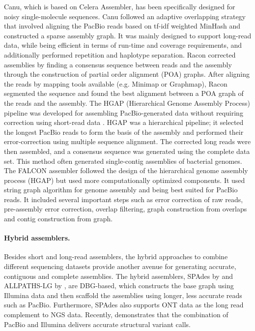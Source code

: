 Canu, which is based on Celera Assembler, has been specifically designed for noisy single-molecule sequences.
Canu followed an adaptive overlapping strategy that involved aligning the PacBio reads based on tf-idf weighted MinHash \citep{berlin2015assembling} and constructed a sparse assembly graph.
It was mainly designed to support long-read data, while being efficient in terms of run-time and coverage requirements, and additionally performed repetition and haplotype separation.
Racon corrected assemblies by finding a consensus sequence between reads and the assembly through the construction of partial order alignment (POA) graphs.
After aligning the reads by mapping tools available (e.g. Minimap or Graphmap),
Racon segmented the sequence and found the best alignment between a POA graph of the reads and the assembly.
The HGAP (Hierarchical Genome Assembly Process) pipeline
was developed for assembling PacBio-generated data without requiring correction using short-read
data \citep{chin2013nonhybrid}. HGAP was a hierarchical pipeline; it selected the longest PacBio reads to form the basis
of the assembly and performed their error-correction using multiple sequence alignment. The corrected
long reads were then assembled, and a consensus sequence was generated using the complete data
set. This method often generated single-contig assemblies of bacterial genomes.
The FALCON assembler followed the design of the hierarchical genome assembly process (HGAP) but used more computationally optimized components. 
It used string graph algorithm for genome assembly and being best suited for PacBio reads.
It included several important steps such as error correction of raw reads, pre-assembly error correction, overlap filtering, graph construction from overlaps and contig construction from graph.

\paragraph{Hybrid assemblers.}
Besides short and long-read assemblers, the hybrid approaches to combine different sequencing datasets provide another avenue for generating accurate, contiguous and complete assemblies. 
The hybrid assemblers, SPAdes by \cite{bankevich2012spades} and ALLPATHS-LG by \cite{gnerre2011high}, are DBG-based, which constructs the base graph using Illumina data and then scaffold the assemblies using longer, less accurate reads such as PacBio. 
Furthermore, SPAdes also supports ONT data as the long read complement to NGS data. 
Recently, \cite{fan2017hysa} demonstrates that the combination of PacBio and Illumina delivers accurate structural variant calls.

